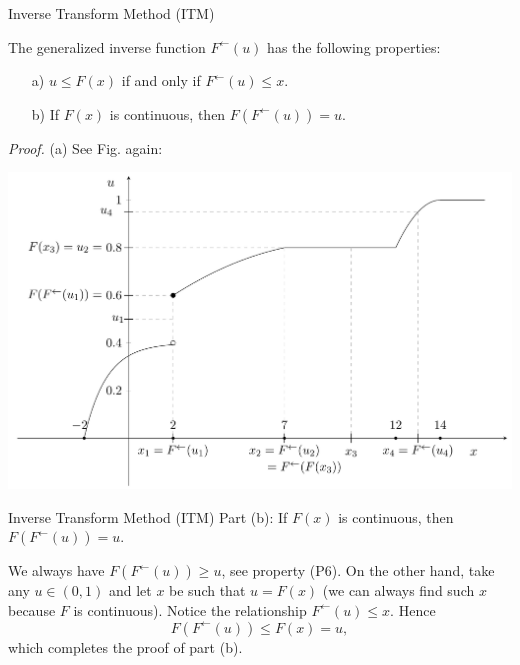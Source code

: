 \documentclass[aspectratio=169]{beamer}
\begin{document}
\begin{frame}{Inverse Transform Method (ITM)}

 \begin{myLemma}\label{l:wlasnosci}
 The generalized inverse function $F^{\leftarrow}(u)$ has the following properties:
 \begin{enumerate}
      \item[a)] $u\le F(x)$ if and only if $F^{\leftarrow}(u)\le x$.
     \item[b)] If $F(x)$ is continuous, then $F(F^{\leftarrow}(u))=u$.
 \end{enumerate}
  \end{myLemma}

\textsl{Proof.}
 (a) See Fig. again:
 \par
 \begin{center}
 \includegraphics[width=0.65\linewidth]{pics/figure_inverse_fun1.png}
 \end{center}

\end{frame}



\begin{frame}{Inverse Transform Method (ITM)}
Part (b): If $F(x)$ is continuous, then $F(F^{\leftarrow}(u))=u$.
\bigskip\par
 We always have $F(F^{\leftarrow}(u))\ge u$, see property (P6).
On the other hand, take any $u\in(0,1)$ and let  $x$ be such that $u=F(x)$ (we can always find such $x$
because $F$ is continuous).
Notice the relationship $F^{\leftarrow}(u)\le x$.
Hence
$$ F(F^{\leftarrow}(u))\le F(x)=u,$$
which completes the proof of part  (b).

\end{frame}
\end{document}
